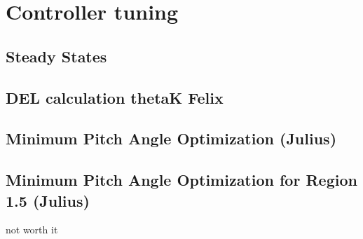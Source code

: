 \chapter{Controller tuning}
\section{Steady States} \label{steady states}

\section{DEL calculation thetaK Felix}

\section{Minimum Pitch Angle Optimization (Julius)} \label{minimum pitch angle static}


\section{Minimum Pitch Angle Optimization for Region 1.5 (Julius)} 

not worth it
